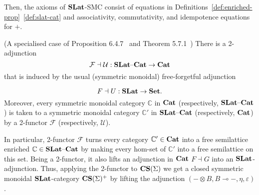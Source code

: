 Then, the axioms of $\mathbf{SLat}$-SMC consist of equations in Definitions~\ref{def:enriched-prop}~\ref{def:slat-cat} and associativity, commutativity, and idempotence equations for $+$.

\begin{proposition}(A specialised case of Proposition 6.4.7~\cite{Borceux_1994} and Theorem 5.7.1~\cite{cruttwell2008normed})
	There is a 2-adjunction
	\vspace{-1mm}
	\[
		\mathcal{F} \dashv \mathcal{U} : \catname{SLat}\text{--}\catname{Cat} \to \catname{Cat}
		\vspace{-1mm}
	\]
	that is induced by the usual (symmetric monoidal) free-forgetful adjunction

	\vspace{-1mm}
	\[
		F \dashv U : \catname{SLat} \to \catname{Set}.
		\vspace{-1mm}
	\]
	Moreover, every symmetric monoidal category $\mathbb{C}$ in $\mathbf{Cat}$ (respectively, $\mathbf{SLat}\text{--}\mathbf{Cat}$) is taken to a symmetric monoidal category $\mathbb{C}'$ in $\mathbf{SLat}\text{--}\mathbf{Cat}$ (respectively, $\mathbf{Cat}$) by a 2-functor $\mathcal{F}$ (respectively, $\mathcal{U}$).
\end{proposition}
In particular, 2-functor $\mathcal{F}$ turns every category $\mathbb{C'} \in \mathbf{Cat}$ into a free semilattice enriched $\mathbb{C} \in \mathbf{SLat}\text{--}\mathbf{Cat}$ by making every hom-set of $\mathbb{C'}$ into a free semilattice on this set.
Being a 2-functor, it also lifts an adjunction in $\mathbf{Cat}$ $F \dashv G$ into an $\mathbf{SLat}$-adjunction.
Thus, applying the 2-functor to $\mathbf{CS}(\Sigma)$ we get a closed symmetric monoidal $\mathbf{SLat}$-category $\mathbf{CS}(\Sigma)^{+}$ by lifting the adjunction $(- \otimes B, B \multimap{} -, \eta, \varepsilon)$.
